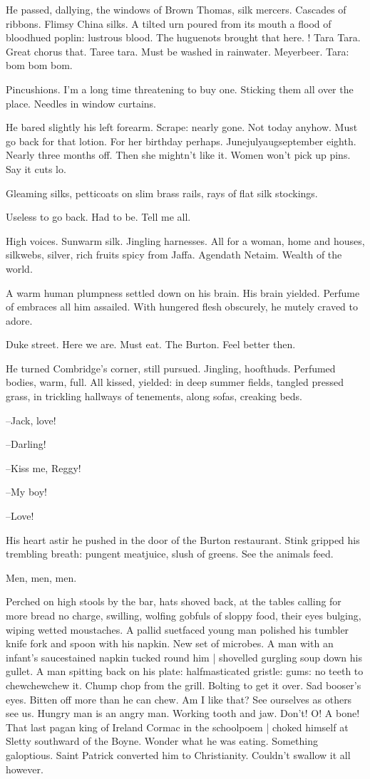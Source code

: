 He passed, dallying,
the windows of Brown Thomas, silk mercers.
Cascades of ribbons.
Flimsy China silks.
A tilted urn poured from its mouth a flood of bloodhued poplin:
lustrous blood.
The huguenots brought that here.
!
Tara Tara.
Great chorus that.
Taree tara.
Must be washed in rainwater.
Meyerbeer.
Tara:
bom bom bom.

Pincushions.
I'm a long time threatening to buy one.
Sticking them all over the place.
Needles in window curtains.

He bared slightly his left forearm.
Scrape: nearly gone.
Not today anyhow.
Must go back for that lotion.
For her birthday perhaps.
Junejulyaugseptember eighth.
Nearly three months off.
Then she mightn't like it.
Women won't pick up pins.
Say it cuts lo.

Gleaming silks,
petticoats on slim brass rails,
rays of flat silk stockings.

Useless to go back.
Had to be.
Tell me all.

High voices.
Sunwarm silk.
Jingling harnesses.
All for a woman,
home and houses,
silkwebs, silver,
rich fruits spicy from Jaffa.
Agendath Netaim.
Wealth of the world.

A warm human plumpness settled down on his brain.
His brain yielded.
Perfume of embraces all him assailed.
With hungered flesh obscurely,
he mutely craved to adore.

Duke street.
Here we are.
Must eat.
The Burton.
Feel better then.

He turned Combridge's corner, still pursued.
Jingling, hoofthuds.
Perfumed bodies, warm, full.
All kissed, yielded:
in deep summer fields,
tangled pressed grass,
in trickling hallways of tenements,
along sofas, creaking beds.

--Jack,
love!

--Darling!

--Kiss me,
Reggy!

--My boy!

--Love!

His heart astir
he pushed in the door of the Burton restaurant.
Stink gripped his trembling breath:
pungent meatjuice, slush of greens.
See the animals feed.

Men, men, men.

Perched on high stools by the bar,
hats shoved back,
at the tables calling for more bread no charge,
swilling,
wolfing gobfuls of sloppy food,
their eyes bulging,
wiping wetted moustaches.
A pallid suetfaced young man polished his tumbler knife fork and spoon with his napkin.
New set of microbes.
A man with an infant's saucestained napkin tucked round him |
shovelled gurgling soup down his gullet.
A man spitting back on his plate:
halfmasticated gristle:
gums:
no teeth to chewchewchew it.
Chump chop from the grill.
Bolting to get it over.
Sad booser's eyes.
Bitten off more than he can chew.
Am I like that?
See ourselves as others see us.
Hungry man is an angry man.
Working tooth and jaw.
Don't!
O! A bone!
That last pagan king of Ireland Cormac in the schoolpoem |
choked himself at Sletty southward of the Boyne.
Wonder what he was eating.
Something galoptious.
Saint Patrick converted him to Christianity.
Couldn't swallow it all however.

